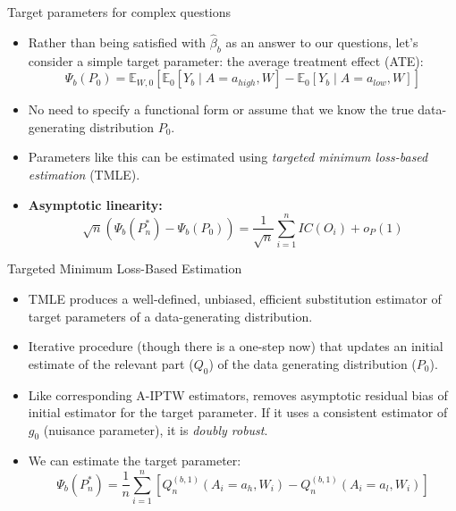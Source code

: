 \documentclass[12pt,t]{beamer}
\begin{document}
\begin{frame}[c]{Target parameters for complex questions}

\begin{center}
\begin{itemize}
  \itemsep12pt
  \item Rather than being satisfied with $\hat{\beta}_{b}$ as an answer to our
    questions, let's consider a simple target parameter: the average treatment
    effect (ATE):
    \[
      \Psi_b(P_0) = \mathbb{E}_{W,0}[\mathbb{E}_0[Y_b \mid A = a_{high}, W] -
      \mathbb{E}_0[Y_b \mid A = a_{low}, W]]
    \]
  \item No need to specify a functional form or assume that we know the true
    data-generating distribution $P_0$.
  \item Parameters like this can be estimated using \textit{targeted minimum
    loss-based estimation} (TMLE).
  \item \textbf{Asymptotic linearity:}
    \[
      \sqrt{n}(\Psi_b(P_n^*) - \Psi_b(P_0)) = \frac{1}{\sqrt{n}}
      \sum_{i = 1}^{n} IC(O_i) + o_P(1)
    \]
\end{itemize}
\end{center}

\end{frame}



\begin{frame}[c]{Targeted Minimum Loss-Based Estimation}

\begin{center}
\begin{itemize}
  \itemsep12pt
  \item TMLE produces a well-defined, unbiased, efficient substitution estimator
    of target parameters of a data-generating distribution.
  \item Iterative procedure (though there is a one-step now) that updates an
    initial estimate of the relevant part ($Q_0$) of the data generating
    distribution ($P_0$).
  \item Like corresponding A-IPTW estimators, removes asymptotic residual bias
    of initial estimator for the target parameter. If it uses a consistent
    estimator of $g_0$ (nuisance parameter), it is \textit{doubly robust}.
  \item We can estimate the target parameter:
    \[
      \Psi_b(P_n^*) = \frac{1}{n}\sum_{i=1}^{n}[Q_n^{(b,1)}(A_i = a_h, W_i) -
      Q_n^{(b,1)}(A_i = a_l, W_i)]
    \]
\end{itemize}
\end{center}

\end{frame}
\end{document}
